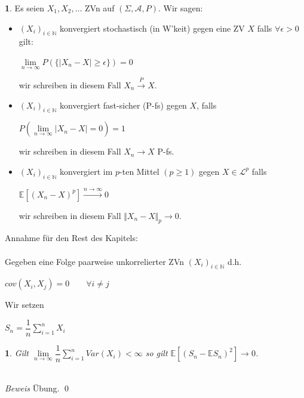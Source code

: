 \documentclass[10pt,a4paper]{report}
\numberwithin{equation}{section}
\numberwithin{figure}{section}
\theoremstyle{plain}
\theoremstyle{definition}
\newtheorem{defn}{\protect\definitionname}[section]
\theoremstyle{plain}
\newtheorem{prop}{\protect\propositionname}[section]
\theoremstyle{definition}
\theoremstyle{remark}
\theoremstyle{plain}
\theoremstyle{plain}
\theoremstyle{plain}
\theoremstyle{plain}
\theoremstyle{plain}
\providecommand{\definitionname}{Definition}
\providecommand{\propositionname}{Satz}
\newcommand{\1}{ \mathbb{1} } %
\begin{document}
\begin{defn}
  Es seien $X_1,X_2,\ldots$ ZVn auf $(\Sigma,\mathcal{A},P)$. Wir
  sagen:
  \begin{itemize}
  \item $(X_i)_{i \in \mathbb{N}}$ konvergiert stochastisch (in
    W'keit) gegen eine ZV $X$ falls $\forall\epsilon >0$ gilt:
    \begin{center}
      $\lim\limits_{n \to \infty}P(\{|X_n-X|\geq \epsilon\})=0$
    \end{center}
    wir schreiben in diesem Fall $X_n \overset{P}{\to} X$.
  \item $(X_i)_{i \in \mathbb{N}}$ konvergiert fast-sicher (P-fs)
    gegen $X$, falls
    \begin{center}
      $P\left(\lim\limits_{n \to \infty}|X_n-X|=0\right)=1$
    \end{center}
    wir schreiben in diesem Fall $X_n \to X$ P-fs.
  \item $(X_i)_{i \in \mathbb{N}}$ konvergiert im $p$-ten Mittel
    $(p\geq 1)$ gegen $X \in \mathcal{L}^p$ falls
    \begin{center}
      $\mathbb{E}[(X_n-X)^p] \overset{n \to \infty}{\to}0$
    \end{center}
    wir schreiben in diesem Fall $\Vert X_n-X\Vert_p \to 0$.\\
  \end{itemize}
  Annahme für den Rest des Kapitels:\\\\
  Gegeben eine Folge paarweise unkorrelierter ZVn $(X_i)_{i \in
    \mathbb{N}}$ d.h.
  \begin{center}
    $cov(X_i,X_j)=0 \qquad \forall i\neq j$
  \end{center}
  Wir setzen
  \begin{center}
    $S_n=\dfrac{1}{n}\sum\limits_{i=1}^nX_i$
  \end{center}
\end{defn}
\begin{prop}
  Gilt $\lim\limits_{n \to \infty} \dfrac{1}{n}\sum\limits_{i=1}^nVar(X_i)<\infty$ so gilt $\mathbb{E}[(S_n-\mathbb{E}S_n)^2]\to 0$.\\\\
\end{prop}
\textit{Beweis} Übung. \qed\\\\
\end{document}
